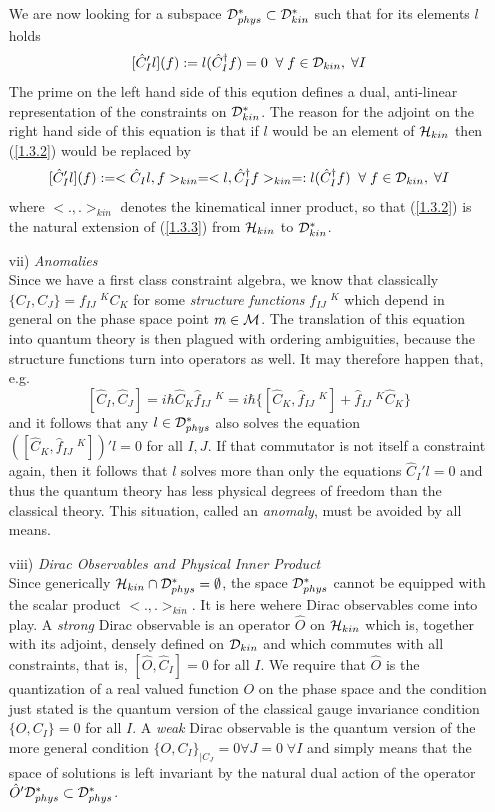 \documentclass[12pt]{report}
\def\be{\begin{equation}}
\def\ee{\end{equation}}
\begin{document}
\begin{itemize}
We are now looking for a subspace 
${\cal D}_{phys}^\ast\subset {\cal D}^\ast_{kin}$ such that for its 
elements $l$ holds
\be \label{1.3.2}
[\hat{C}_I' l](f):=l(\hat{C}_I^\dagger f)=0\;\;\forall\; f\in 
{\cal D}_{kin},\; \forall I
\ee
The prime on the left hand side of this eqution defines a dual, anti-linear
representation of the constraints on ${\cal D}_{kin}^\ast$. The reason 
for the adjoint on the right hand side of this equation is that if
$l$ would be an element of ${\cal H}_{kin}$ then (\ref{1.3.2}) would be 
replaced by
\be \label{1.3.3}
[\hat{C}_I' l](f):=<\hat{C}_I l,f>_{kin}=
<l,\hat{C}_I^\dagger f>_{kin}=:l(\hat{C}_I^\dagger f)\;\;\forall\; 
f\in {\cal D}_{kin},\; \forall I
\ee
where $<.,.>_{kin}$ denotes the kinematical inner product,
so that (\ref{1.3.2}) is the natural extension of (\ref{1.3.3}) from 
${\cal H}_{kin}$ to ${\cal D}_{kin}^\ast$.
%
\item[vii)] {\it Anomalies}\\
Since we have a first class constraint algebra, we know that classically 
$\{C_I,C_J\}=f_{IJ}\;^K C_K$ for some 
{\it structure functions} $f_{IJ}\;^K$ which depend in general on the 
phase space point $m\in {\cal M}$. The translation of this equation into
quantum theory is then plagued with ordering ambiguities, because 
the structure functions turn into operators as well. It may therefore 
happen that, e.g. 
\be \label{1.3.4}
[\hat{C}_I,\hat{C}_J]
=i\hbar \hat{C}_K \hat{f}_{IJ}\;^K
=i\hbar\{[\hat{C}_K,\hat{f}_{IJ}\;^K]
+\hat{f}_{IJ}\;^K \hat{C}_K \}
\ee
and it follows that any $l\in {\cal D}_{phys}^\ast$ also solves the 
equation $([\hat{C}_K,\hat{f}_{IJ}\;^K])'l=0$ for all $I,J$. If that
commutator is not itself a constraint again, then it follows that $l$
solves more than only the equations $\hat{C}_I' l=0$ and thus the quantum
theory has less physical degrees of freedom than the classical theory.
This situation, called an {\it anomaly}, must be avoided by all means.
%
\item[viii)] {\it Dirac Observables and Physical Inner Product}\\
Since generically ${\cal H}_{kin}\cap {\cal D}_{phys}^\ast=\emptyset$,
the space ${\cal D}_{phys}^\ast$ cannot be equipped with the scalar
product $<.,.>_{kin}$. It is here wehere Dirac observables come into play.
A {\it strong} Dirac observable is an operator $\hat{O}$ on ${\cal H}_{kin}$ 
which is, together with its adjoint, densely defined on ${\cal D}_{kin}$ and 
which commutes with all constraints, that is, $[\hat{O},\hat{C}_I]=0$
for all $I$. We require that $\hat{O}$ is the quantization of a real valued
function $O$ on the phase space and the condition just stated is the quantum 
version of the classical gauge invariance condition $\{O,C_I\}=0$ for all
$I$. A {\it weak} Dirac observable is the quantum version of the more
general condition $\{O,C_I\}_{|C_J}=0 \forall J=0\;\forall I$ and simply 
means that the space of solutions is left invariant by the 
natural dual action of the operator 
$\hat{O}'{\cal D}_{phys}^\ast\subset {\cal D}_{phys}^\ast$.  


\end{itemize}
\end{document}
